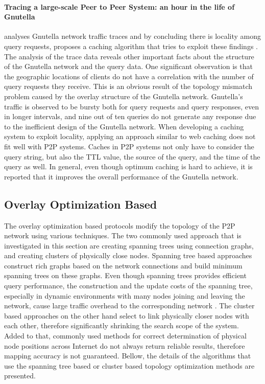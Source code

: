 \documentclass[acmcsur,acmnow]{acmtrans2m}
\begin{document}
\paragraph*{\bf Tracing a large-scale Peer to Peer System: an hour in the life of
Gnutella}

\cite{Markatos02} analyses Gnutella network traffic traces and by concluding there is locality among query requests, proposes a caching algorithm that tries to exploit these findings . The analysis of the trace data reveals other important facts about the structure of the Gnutella network and the query data.  One significant observation is that the geographic locations of clients do not have a correlation with the number of query requests they receive. This is an obvious result of the topology mismatch problem caused by the overlay structure of the Gnutella network. Gnutella's traffic is observed to be bursty
both for query requests and query responses, even in longer intervals, and nine
out of ten queries do not generate any response due to the inefficient design of
the Gnutella network. When developing a caching system to exploit locality,
applying an approach similar to web caching does not fit well with P2P systems.
Caches in P2P systems not only have to consider the query string, but also
the TTL value, the source of the query, and the time of the query as well.  In
general, even though optimum caching is hard to achieve, it is reported that
it improves the overall performance of the Gnutella network.

\subsection{Overlay Optimization Based}

The overlay optimization based protocols modify the topology of the P2P network
using various techniques. The two commonly used approach that is investigated in
this section are creating spanning trees using 
connection graphs, and creating clusters of physically close nodes. 
Spanning tree based approaches construct rich graphs based on the network
connections and build minimum spanning trees on these graphs. Even though spanning trees provides efficient query performance, the construction
and the update costs of the spanning tree, especially in dynamic environments
with many nodes joining and leaving the network, cause large traffic
overhead to the corresponding network \cite{chu_esm_2000,chu_esm_2002}. The cluster based approaches on the other hand select to link physically closer nodes with each other, therefore significantly shrinking the search scope of the system. Added to that,
commonly used methods for correct determination of physical node positions across Internet do not always return reliable results, therefore mapping
accuracy is not guaranteed. Bellow, the details of the algorithms that use the spanning tree based or cluster based topology optimization methods are presented.
\end{document}
